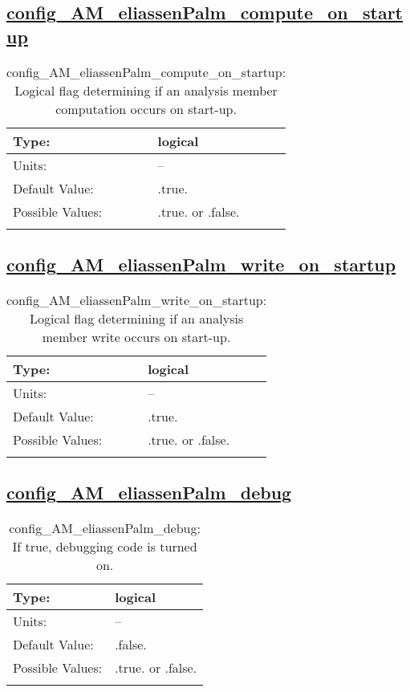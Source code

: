 \subsection[config\_AM\_eliassenPalm\_compute\_on\_startup]{\hyperref[sec:nm_tab_AM_eliassenPalm]{config\_AM\_eliassenPalm\_compute\_on\_startup}}
\label{subsec:nm_sec_config_AM_eliassenPalm_compute_on_startup}
\begin{center}
\begin{longtable}{| p{2.0in} || p{4.0in} |}
    \hline
    Type: & logical \\
    \hline
    Units: & -- \\
    \hline
    Default Value: & .true. \\
    \hline
    Possible Values: & .true. or .false. \\
    \hline
    \caption{config\_AM\_eliassenPalm\_compute\_on\_startup: Logical flag determining if an analysis member computation occurs on start-up.}
\end{longtable}
\end{center}
\subsection[config\_AM\_eliassenPalm\_write\_on\_startup]{\hyperref[sec:nm_tab_AM_eliassenPalm]{config\_AM\_eliassenPalm\_write\_on\_startup}}
\label{subsec:nm_sec_config_AM_eliassenPalm_write_on_startup}
\begin{center}
\begin{longtable}{| p{2.0in} || p{4.0in} |}
    \hline
    Type: & logical \\
    \hline
    Units: & -- \\
    \hline
    Default Value: & .true. \\
    \hline
    Possible Values: & .true. or .false. \\
    \hline
    \caption{config\_AM\_eliassenPalm\_write\_on\_startup: Logical flag determining if an analysis member write occurs on start-up.}
\end{longtable}
\end{center}
\subsection[config\_AM\_eliassenPalm\_debug]{\hyperref[sec:nm_tab_AM_eliassenPalm]{config\_AM\_eliassenPalm\_debug}}
\label{subsec:nm_sec_config_AM_eliassenPalm_debug}
\begin{center}
\begin{longtable}{| p{2.0in} || p{4.0in} |}
    \hline
    Type: & logical \\
    \hline
    Units: & -- \\
    \hline
    Default Value: & .false. \\
    \hline
    Possible Values: & .true. or .false. \\
    \hline
    \caption{config\_AM\_eliassenPalm\_debug: If true, debugging code is turned on.}
\end{longtable}
\end{center}

